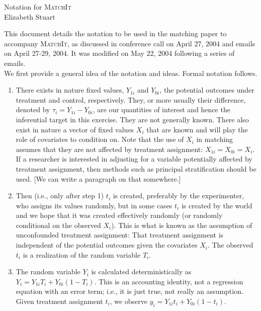 \documentclass[oneside,letterpaper,titlepage,12pt]{article}
\newcommand{\MatchIt}{\textsc{MatchIt}}
\begin{document}
\begin{center}
Notation for \MatchIt \\
Elizabeth Stuart \\
\end{center}

This document details the notation to be used in the matching paper to accompany \MatchIt,
as discussed in conference call on April 27, 2004 and emails on April 27-29, 2004. It was modified on May 22, 2004 following a series of emails. \\

We first provide a general idea of the notation and ideas.  Formal notation follows.

\begin{enumerate}
\item  There exists in nature fixed values, $Y_{1i}$ and $Y_{0i}$, the
potential outcomes under treatment and control, respectively.  They, or
more usually their difference, denoted by $\tau_i=Y_{1i}-Y_{0i}$, are our quantities of interest and hence
the inferential target in this exercise.  They are not generally known.
There also exist in nature a vector of fixed values $X_i$ that are known and
will play the role of covariates to condition on.  Note that the use of $X_i$ in matching assumes that they are not 
affected by treatment assignment: $X_{1i}=X_{0i}=X_i$.  If a researcher is interested in adjusting for a variable potentially affected by treatment
assignment, then methods such as principal stratification should be used. [We can write a paragraph on that somewhere.]

\item  Then (i.e., only after step 1) $t_i$ is created, preferably by the
experimenter, who assigns its values randomly, but in some cases $t_i$ is
created by the world and we hope that it was created effectively randomly
(or randomly conditional on the observed $X_i$).  This is what is known as the assumption of 
unconfounded treatment assignment: That treatment assignment is independent of
the potential outcomes given the covariates $X_i$.  The observed $t_i$ is a realization of the random variable $T_i$. 

\item  The random variable $Y_i$ is calculated
deterministically as $Y_i = Y_{1i}T_i + Y_{0i}(1-T_i)$.  This is
an accounting identity, not a regression equation with an error term;
i.e., it is just true, not really an assumption.  Given treatment assignment $t_i$, we observe
$y_i = Y_{1i}t_i + Y_{0i} (1-t_i)$.
\end{enumerate}
\end{document}
